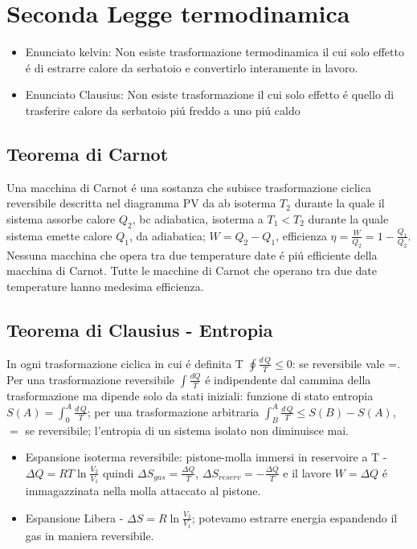     \chapter{Seconda Legge termodinamica}
        \begin{itemize}
            \item Enunciato kelvin: Non esiste trasformazione termodinamica il cui solo effetto \'e di estrarre calore da serbatoio e convertirlo interamente in lavoro.
        \item Enunciato Clausius: Non esiste trasformazione il cui solo effetto \'e quello di trasferire calore da serbatoio pi\'u freddo a uno pi\'u caldo
        \end{itemize}
        \section{Teorema di Carnot}
        Una macchina di Carnot \'e una sostanza che subisce trasformazione ciclica reversibile descritta nel diagramma PV da ab isoterma $T_2$ durante la quale il sistema assorbe calore $Q_2$, bc adiabatica, isoterma a $T_1<T_2$ durante la quale sistema emette calore $Q_1$, da adiabatica; $W=Q_2-Q_1$, efficienza $\eta=\frac{W}{Q_2}=1-\frac{Q_1}{Q_2}$. Nessuna macchina che opera tra due temperature date \'e pi\'u efficiente della macchina di Carnot. Tutte le macchine di Carnot che operano tra due date temperature hanno medesima efficienza.
        \section{Teorema di Clausius - Entropia}
        In ogni trasformazione ciclica in cui \'e definita T $\oint \frac{d\,Q}{T}\leq0$: se reversibile vale =.
            Per una trasformazione reversibile $\int \frac{dQ}{T}$ \'e indipendente dal cammina della trasformazione ma dipende solo da stati iniziali: funzione di stato entropia $S(A)=\int_0^A \frac{d\,Q}{T}$; per una trasformazione arbitraria $\int_B^A \frac{d\,Q}{T}\leq S(B)-S(A)$, $=$ se reversibile; l'entropia di un sistema isolato non diminuisce mai.
        \begin{itemize}
        \item Espansione isoterma reversibile: pistone-molla immersi in reservoire a T - $\Delta Q=RT\ln{\frac{V_2}{V_1}}$ quindi $\Delta S_{gas}=\frac{\Delta Q}{T}$, $\Delta S_{reserv}=-\frac{\Delta Q}{T}$ e il lavore $W=\Delta Q$ \'e immagazzinata nella molla attaccato al pistone.
        \item Espansione Libera - $\Delta S=R\ln{\frac{V_2}{V_1}}$; potevamo estrarre energia espandendo il gas in maniera reversibile.
        \end{itemize}
